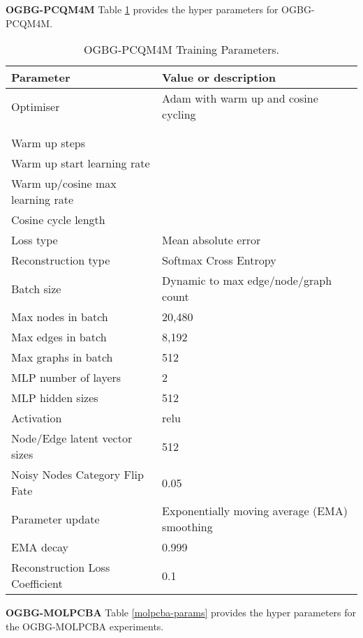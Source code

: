 \documentclass{article} \usepackage{iclr2022_conference,times}
\begin{document}
\textbf{OGBG-PCQM4M} Table \ref{pcqm4m-params} provides the hyper parameters for OGBG-PCQM4M.
\begin{table}[]
\caption{OGBG-PCQM4M Training Parameters.}
    \label{pcqm4m-params}
    \centering
    \begin{tabular}{ll}
      \toprule
       Parameter & Value or description \\
       \midrule
       Optimiser & Adam with warm up and cosine cycling \\
          &  \\              
          &  \\                     
       Warm up steps    &  \\
       Warm up start learning rate    &  \\       
       Warm up/cosine max learning rate    &  \\       
       Cosine cycle length    &  \\       
       Loss type & Mean absolute error \\
       Reconstruction type & Softmax Cross Entropy \\
     \midrule
       Batch size & Dynamic to max edge/node/graph count \\
       Max nodes in batch & 20,480 \\
       Max edges in batch & 8,192 \\   
       Max graphs in batch & 512 \\    
     \midrule
       MLP number of layers & 2 \\
       MLP hidden sizes & 512 \\
       Activation & relu \\
       Node/Edge latent vector sizes & 512 \\ 
     \midrule
      
       Noisy Nodes Category Flip Fate & 0.05 \\
       Parameter update & Exponentially moving average (EMA) smoothing \\
       EMA decay & 0.999 \\
       Reconstruction Loss Coefficient & 0.1 \\
    \bottomrule

\end{tabular}
\end{table}


\textbf{OGBG-MOLPCBA} Table \ref{molpcba-params} provides the hyper parameters for the OGBG-MOLPCBA experiments.
\end{document}
